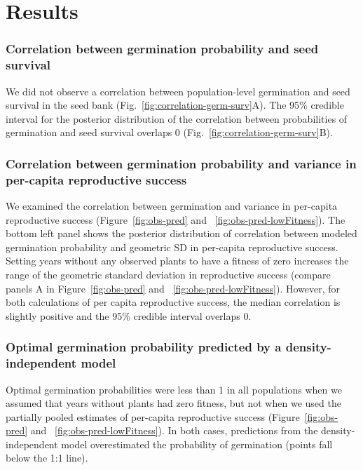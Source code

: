 \documentclass[12pt, oneside, titlepage]{article}   	%
\begin{document}
{\section*{Results}

\subsubsection*{Correlation between germination probability and seed survival}

We did not observe a correlation between population-level germination and seed survival in the seed bank (Fig.~\ref{fig:correlation-germ-surv}A). The 95\% credible interval for the posterior distribution of the correlation between probabilities of germination and seed survival overlaps 0 (Fig.~\ref{fig:correlation-germ-surv}B). 

\subsubsection*{Correlation between germination probability and variance in per-capita reproductive success}

We examined the correlation between germination and variance in per-capita reproductive success (Figure~\ref{fig:obs-pred} and ~\ref{fig:obs-pred-lowFitness}). The bottom left panel shows the posterior distribution of correlation between modeled germination probability and geometric SD in per-capita reproductive success. Setting years without any observed plants to have a fitness of zero increases the range of the geometric standard deviation in reproductive success (compare panels A in Figure~\ref{fig:obs-pred} and ~\ref{fig:obs-pred-lowFitness}). However, for both calculations of per capita reproductive success, the median correlation is slightly positive and the 95\% credible interval overlaps 0.

\subsubsection*{Optimal germination probability predicted by a density-independent model}

Optimal germination probabilities were less than 1 in all populations when we assumed that years without plants had zero fitness, but not when we used the partially pooled estimates of per-capita reproductive success (Figure~\ref{fig:obs-pred} and ~\ref{fig:obs-pred-lowFitness}). In both cases, predictions from the density-independent model overestimated the probability of germination (points fall below the 1:1 line).

}
\end{document}

